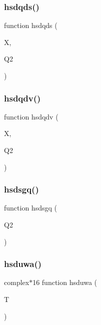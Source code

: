 \subsubsection{\texorpdfstring{hsdqds()}{hsdqds()}}
{\footnotesize\ttfamily function hsdqds (\begin{DoxyParamCaption}\item[{}]{X,  }\item[{}]{Q2 }\end{DoxyParamCaption})}

\mbox{\label{djangoh__h_8f_a90e6b56cb0363038734c1691a486d526}} 
\subsubsection{\texorpdfstring{hsdqdv()}{hsdqdv()}}
{\footnotesize\ttfamily function hsdqdv (\begin{DoxyParamCaption}\item[{}]{X,  }\item[{}]{Q2 }\end{DoxyParamCaption})}

\mbox{\label{djangoh__h_8f_a9cd17c523f49f61903b0d778ec11a2f3}} 
\subsubsection{\texorpdfstring{hsdsgq()}{hsdsgq()}}
{\footnotesize\ttfamily function hsdsgq (\begin{DoxyParamCaption}\item[{}]{Q2 }\end{DoxyParamCaption})}

\mbox{\label{djangoh__h_8f_afe5273222943b51794b89c1840ac6eb3}} 
\subsubsection{\texorpdfstring{hsduwa()}{hsduwa()}}
{\footnotesize\ttfamily complex$\ast$16 function hsduwa (\begin{DoxyParamCaption}\item[{}]{T }\end{DoxyParamCaption})}

